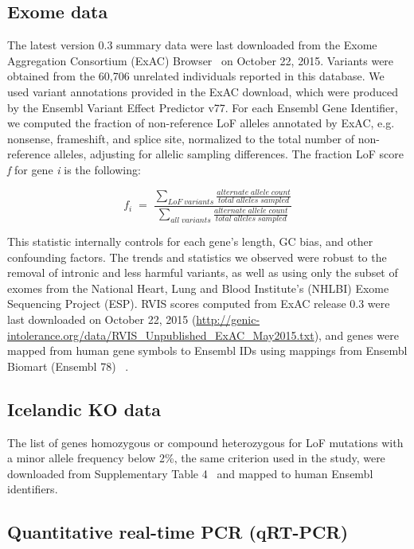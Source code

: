 \subsection{Exome data}

The latest version 0.3 summary data were last downloaded from the Exome
Aggregation Consortium (ExAC) Browser~\citep{Consortium:2015ib} on October 22, 2015. Variants were obtained from the 60,706
unrelated individuals reported in this database. We used variant
annotations provided in the ExAC download, which were produced by the
Ensembl Variant Effect Predictor v77. For each Ensembl Gene Identifier,
we computed the fraction of non-reference LoF alleles annotated by ExAC,
e.g. nonsense, frameshift, and splice site, normalized to the total
number of non-reference alleles, adjusting for allelic sampling
differences. The fraction LoF score \emph{f} for gene \emph{i} is the
following:

\[f_{i}\; =\; \frac{\sum_{LoF\; variants}^{\; }{\frac{alternate\; allele\; count}{total\; alleles\; sampled}}}{\sum_{all\; variants}^{\; }{\frac{alternate\; allele\; count}{total\; alleles\; sampled}}}\]

This statistic internally controls for each gene's length, GC bias, and
other confounding factors. The trends and statistics we observed were
robust to the removal of intronic and less harmful variants, as well as
using only the subset of exomes from the National Heart, Lung and Blood
Institute's (NHLBI) Exome Sequencing Project (ESP). RVIS scores computed
from ExAC release 0.3 were last downloaded on October 22, 2015
(\url{http://genic-intolerance.org/data/RVIS\_Unpublished\_ExAC\_May2015.txt}),
and genes were mapped from human gene symbols to Ensembl IDs using
mappings from Ensembl Biomart (Ensembl 78) ~\citep{Cunningham:2015ew}.

\subsection{Icelandic KO data}

The list of genes homozygous or compound heterozygous for LoF mutations
with a minor allele frequency below 2\%, the same criterion used in the
study, were downloaded from Supplementary Table 4~\citep{Sulem:2015fi}
and mapped to human Ensembl identifiers.

\subsection{Quantitative real-time PCR (qRT-PCR)}

